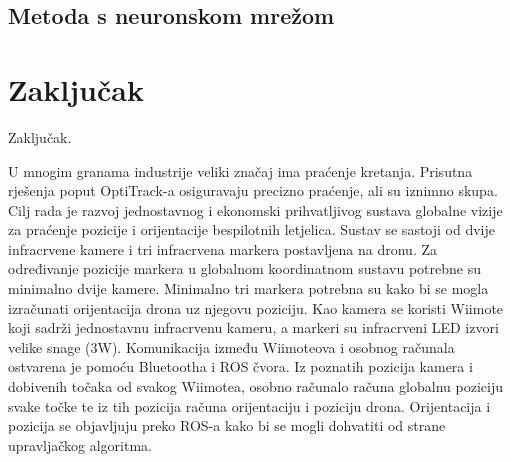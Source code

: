 \documentclass[times, utf8, diplomski]{fer}
\begin{document}
\section{Metoda s neuronskom mrežom}


\chapter{Zaključak}
Zaključak.




\begin{sazetak}
U mnogim granama industrije veliki značaj ima praćenje kretanja. Prisutna rješenja poput OptiTrack-a osiguravaju precizno praćenje, ali su iznimno skupa. Cilj rada je razvoj jednostavnog i ekonomski prihvatljivog sustava globalne vizije za praćenje pozicije i orijentacije bespilotnih letjelica. Sustav se sastoji od dvije infracrvene kamere i tri infracrvena markera postavljena na dronu. Za određivanje pozicije markera u globalnom koordinatnom sustavu potrebne su minimalno dvije kamere. Minimalno tri markera potrebna su kako bi se mogla izračunati orijentacija drona uz njegovu poziciju. Kao kamera se koristi Wiimote koji sadrži jednostavnu infracrvenu kameru, a markeri su infracrveni LED izvori velike snage (3W). Komunikacija između Wiimoteova i osobnog računala ostvarena je pomoću Bluetootha i ROS čvora. Iz poznatih pozicija kamera i dobivenih točaka od svakog Wiimotea, osobno računalo računa globalnu poziciju svake točke te iz tih pozicija računa orijentaciju i poziciju drona. Orijentacija i pozicija se objavljuju preko ROS-a kako bi se mogli dohvatiti od strane upravljačkog algoritma. 

\end{sazetak}
\newpage
\end{document}
